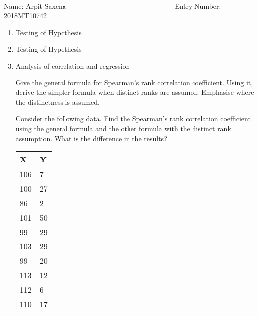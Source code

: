 \documentclass[12pt, oneside]{article}
\begin{document}
\setlength{\textheight}{8.5in}
\\





\vskip 0.5cm

\noindent Name: Arpit Saxena ~~~  ~~~~~ ~~~~ ~~~~~~~~~~~~~~~~ Entry Number: 2018MT10742 ~~~~~~~~~~~



\vskip 0.5cm



\begin{enumerate}
	



\item	Testing of Hypothesis


\item	 Testing of Hypothesis


\item {
    Analysis of correlation and regression 

    Give the general formula for Spearman's rank correlation coefficient. Using it,
    derive the simpler formula when distinct ranks are assumed. Emphasise where the
    distinctness is assumed.

    Consider the following data. Find the Spearman's rank correlation coefficient
    using the general formula and the other formula with the distinct rank assumption.
    What is the difference in the results?

    \begin{center}
    \begin{tabular}{ | l | l | }
        \hline
        \textbf{X} & \textbf{Y} \\
        \hline
        106 &	7 \\
        100 &  	27 \\
        86 & 2 \\
        101 &	50 \\
        99 &	29 \\
        103 &	29 \\
        99 &	20 \\
        113 &	12 \\
        112 &	6 \\
        110 &	17 \\
        \hline
    \end{tabular}
    \end{center}

}
\end{enumerate}
\end{document}
